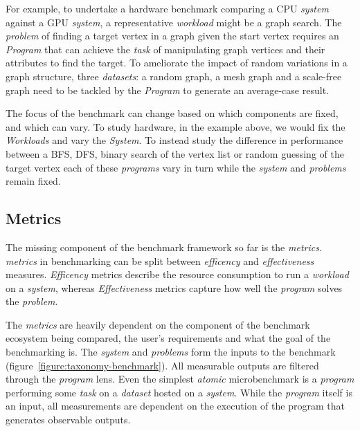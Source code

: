
For example, to undertake a hardware benchmark comparing a CPU \textit{system} against a GPU \textit{system}, a representative \textit{workload} might be a graph search. 
The \textit{problem} of finding a target vertex in a graph given the start vertex requires an \textit{Program} that can achieve the \textit{task} of manipulating graph vertices and their attributes to find the target.
To ameliorate the impact of random variations in a graph structure, three \textit{datasets}: a random graph, a mesh graph and a scale-free graph need to be tackled by the \textit{Program} to generate an average-case result. 

The focus of the benchmark can change based on which components are fixed, and which can vary. 
To study hardware, in the example above, we would fix the \textit{Workloads} and vary the \textit{System}.
To instead study the difference in performance between a BFS, DFS, binary search of the vertex list or random guessing of the target vertex each of these \textit{programs} vary in turn while the \textit{system} and \textit{problems} remain fixed. 



\subsection{Metrics}

The missing component of the benchmark framework so far is the \textit{metrics}.
\textit{metrics} in benchmarking can be split between \textit{efficency} and \textit{effectiveness} measures. 
\textit{Efficency} metrics describe the resource consumption to run a \textit{workload} on a \textit{system}, whereas \textit{Effectiveness} metrics capture how well the \textit{program} solves the \textit{problem}.

The \textit{metrics} are heavily dependent on the component of the benchmark ecosystem being compared, the user's requirements and what the goal of the benchmarking is. 
The \textit{system} and \textit{problems} form the inputs to the benchmark (figure~\ref{figure:taxonomy-benchmark}). 
All measurable outputs are filtered through the \textit{program} lens. 
Even the simplest \textit{atomic} microbenchmark is a \textit{program} performing some \textit{task} on a \textit{dataset} hosted on a \textit{system}. 
While the \textit{program} itself is an input, all measurements are dependent on the execution of the program that generates observable outputs.

